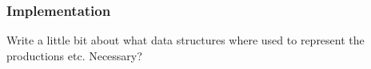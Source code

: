 \subsubsection{Implementation}
Write a little bit about what data structures where used to represent the productions etc. Necessary?






